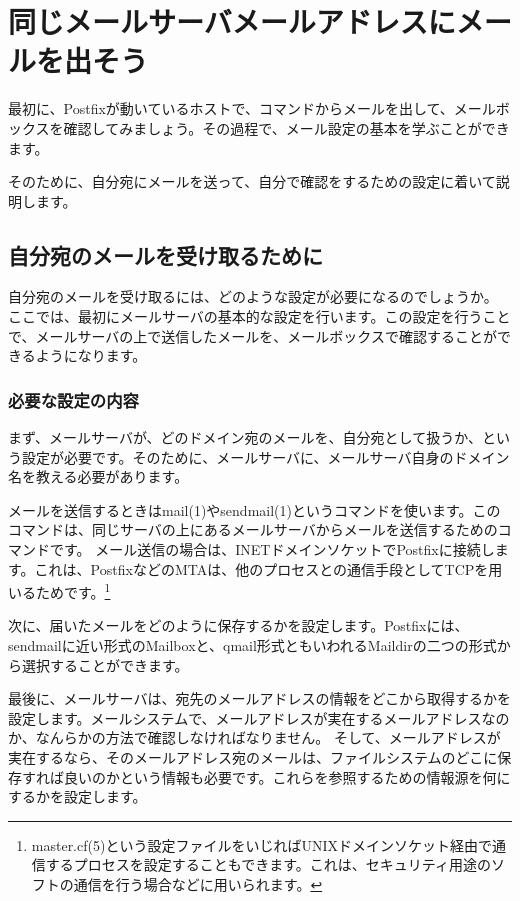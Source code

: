 \chapter{同じメールサーバメールアドレスにメールを出そう}

最初に、Postfixが動いているホストで、コマンドからメールを出して、メールボックスを確認してみましょう。その過程で、メール設定の基本を学ぶことができます。

そのために、自分宛にメールを送って、自分で確認をするための設定に着いて説明します。

\section{自分宛のメールを受け取るために}

自分宛のメールを受け取るには、どのような設定が必要になるのでしょうか。
ここでは、最初にメールサーバの基本的な設定を行います。この設定を行うことで、メールサーバの上で送信したメールを、メールボックスで確認することができるようになります。

\subsection{必要な設定の内容}

まず、メールサーバが、どのドメイン宛のメールを、自分宛として扱うか、という設定が必要です。そのために、メールサーバに、メールサーバ自身のドメイン名を教える必要があります。

メールを送信するときはmail(1)やsendmail(1)というコマンドを使います。このコマンドは、同じサーバの上にあるメールサーバからメールを送信するためのコマンドです。
メール送信の場合は、INETドメインソケットでPostfixに接続します。これは、PostfixなどのMTAは、他のプロセスとの通信手段としてTCPを用いるためです。\footnote{master.cf(5)という設定ファイルをいじればUNIXドメインソケット経由で通信するプロセスを設定することもできます。これは、セキュリティ用途のソフトの通信を行う場合などに用いられます。}

次に、届いたメールをどのように保存するかを設定します。Postfixには、sendmailに近い形式のMailboxと、qmail形式ともいわれるMaildirの二つの形式から選択することができます。

最後に、メールサーバは、宛先のメールアドレスの情報をどこから取得するかを設定します。メールシステムで、メールアドレスが実在するメールアドレスなのか、なんらかの方法で確認しなければなりません。
そして、メールアドレスが実在するなら、そのメールアドレス宛のメールは、ファイルシステムのどこに保存すれば良いのかという情報も必要です。これらを参照するための情報源を何にするかを設定します。

